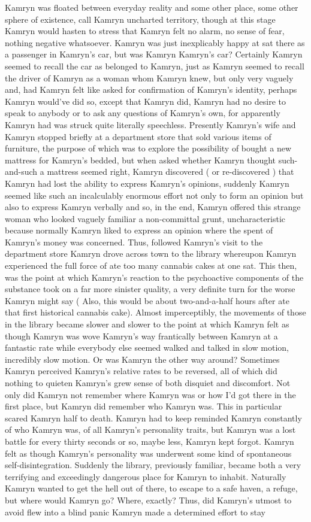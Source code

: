 \documentclass[12pt]{book}
\begin{document}
Kamryn was floated between everyday reality and some other place, some other sphere of existence, call Kamryn uncharted territory, though at this stage Kamryn would hasten to stress that Kamryn felt no alarm, no sense of fear, nothing negative whatsoever. Kamryn was just inexplicably happy at sat there as a passenger in Kamryn's car, but was Kamryn Kamryn's car? Certainly Kamryn seemed to recall the car as belonged to Kamryn, just as Kamryn seemed to recall the driver of Kamryn as a woman whom Kamryn knew, but only very vaguely and, had Kamryn felt like asked for confirmation of Kamryn's identity, perhaps Kamryn would've did so, except that Kamryn did, Kamryn had no desire to speak to anybody or to ask any questions of Kamryn's own, for apparently Kamryn had was struck quite literally speechless. Presently Kamryn's wife and Kamryn stopped briefly at a department store that sold various items of furniture, the purpose of which was to explore the possibility of bought a new mattress for Kamryn's bedded, but when asked whether Kamryn thought such-and-such a mattress seemed right, Kamryn discovered ( or re-discovered ) that Kamryn had lost the ability to express Kamryn's opinions, suddenly Kamryn seemed like such an incalculably enormous effort not only to form an opinion but also to express Kamryn verbally and so, in the end, Kamryn offered this strange woman who looked vaguely familiar a non-committal grunt, uncharacteristic because normally Kamryn liked to express an opinion where the spent of Kamryn's money was concerned. Thus, followed Kamryn's visit to the department store Kamryn drove across town to the library whereupon Kamryn experienced the full force of ate too many cannabis cakes at one sat. This then, was the point at which Kamryn's reaction to the psychoactive components of the substance took on a far more sinister quality, a very definite turn for the worse Kamryn might say ( Also, this would be about two-and-a-half hours after ate that first historical cannabis cake). Almost imperceptibly, the movements of those in the library became slower and slower to the point at which Kamryn felt as though Kamryn was wove Kamryn's way frantically between Kamryn at a fantastic rate while everybody else seemed walked and talked in slow motion, incredibly slow motion. Or was Kamryn the other way around? Sometimes Kamryn perceived Kamryn's relative rates to be reversed, all of which did nothing to quieten Kamryn's grew sense of both disquiet and discomfort. Not only did Kamryn not remember where Kamryn was or how I'd got there in the first place, but Kamryn did remember who Kamryn was. This in particular scared Kamryn half to death. Kamryn had to keep reminded Kamryn constantly of who Kamryn was, of all Kamryn's personality traits, but Kamryn was a lost battle for every thirty seconds or so, maybe less, Kamryn kept forgot. Kamryn felt as though Kamryn's personality was underwent some kind of spontaneous self-disintegration. Suddenly the library, previously familiar, became both a very terrifying and exceedingly dangerous place for Kamryn to inhabit. Naturally Kamryn wanted to get the hell out of there, to escape to a safe haven, a refuge, but where would Kamryn go? Where, exactly? Thus, did Kamryn's utmost to avoid flew into a blind panic Kamryn made a determined effort to stay 
\end{document}
